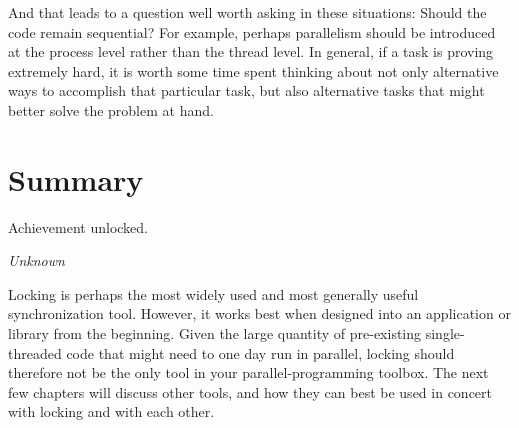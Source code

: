 And that leads to a question well worth asking in these situations:
Should the code remain sequential?
For example, perhaps parallelism should be introduced at the process level
rather than the thread level.
In general, if a task is proving extremely hard, it is worth some time
spent thinking about not only alternative ways to accomplish that
particular task, but also alternative tasks that might better solve
the problem at hand.

\section{Summary}
\label{sec:locking:Summary}
%
\epigraph{Achievement unlocked.}{\emph{Unknown}}

Locking is perhaps the most widely used and most generally useful
synchronization tool.
However, it works best when designed into an application
or library from the beginning.
Given the large quantity of pre-existing single-threaded code that might
need to one day run in parallel, locking should therefore not be the
only tool in your parallel-programming toolbox.
The next few chapters will discuss other tools, and how they can best
be used in concert with locking and with each other.

